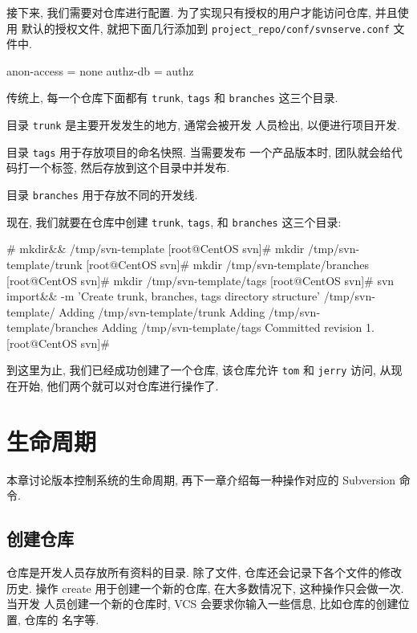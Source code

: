 \documentclass[nofonts, oneside]{ctexbook}
\begin{document}
接下来, 我们需要对仓库进行配置. 为了实现只有授权的用户才能访问仓库, 并且使用
默认的授权文件, 就把下面几行添加到
\texttt{project\_repo/conf/svnserve.conf}
文件中.
\begin{svnshell}
anon-access = none
authz-db = authz
\end{svnshell}

传统上, 每一个仓库下面都有 \texttt{trunk}, \texttt{tags} 和 \texttt{branches}
这三个目录.

目录 \texttt{trunk} 是主要开发发生的地方, 通常会被开发
人员检出, 以便进行项目开发.

目录 \texttt{tags} 用于存放项目的命名快照. 当需要发布
一个产品版本时, 团队就会给代码打一个标签, 然后存放到这个目录中并发布.

目录 \texttt{branches} 用于存放不同的开发线.

现在, 我们就要在仓库中创建 \texttt{trunk}, \texttt{tags}, 和 \texttt{branches}
这三个目录:
\begin{svnshell}
# mkdir&& /tmp/svn-template
[root@CentOS svn]# mkdir /tmp/svn-template/trunk
[root@CentOS svn]# mkdir /tmp/svn-template/branches
[root@CentOS svn]# mkdir /tmp/svn-template/tags
[root@CentOS svn]# svn import&& -m 'Create trunk, branches, tags directory structure' /tmp/svn-template/
Adding              /tmp/svn-template/trunk
Adding              /tmp/svn-template/branches
Adding              /tmp/svn-template/tags
Committed revision 1.
[root@CentOS svn]#
\end{svnshell}

到这里为止, 我们已经成功创建了一个仓库, 该仓库允许 \texttt{tom} 和
\texttt{jerry} 访问, 从现在开始, 他们两个就可以对仓库进行操作了.

\chapter{生命周期}
\label{chap:life_cycle}

本章讨论版本控制系统的生命周期, 再下一章介绍每一种操作对应的 Subversion 命令.

\section{创建仓库}
\label{sec:create_repository}

仓库是开发人员存放所有资料的目录. 除了文件, 仓库还会记录下各个文件的修改历史.
操作 create 用于创建一个新的仓库, 在大多数情况下, 这种操作只会做一次. 当开发
人员创建一个新的仓库时, VCS 会要求你输入一些信息, 比如仓库的创建位置, 仓库的
名字等.
\end{document}
